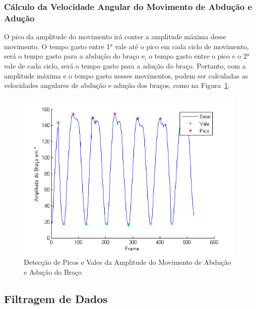 \subsubsection{Cálculo da Velocidade Angular do Movimento de Abdução e Adução}
O pico da amplitude do movimento irá conter a amplitude máxima desse movimento. O tempo gasto entre 1° vale até o pico em cada ciclo de movimento, será o tempo gasto para a abdução do braço e, o tempo gasto entre o pico e o 2° vale de cada ciclo, será o tempo gasto para a adução do braço. Portanto, com a amplitude máxima e o tempo gasto nesses movimentos, podem ser calculadas as velocidades angulares de abdução e adução dos braços, como na Figura~\ref{img:amplitude_braco_picos_vales}.
\begin{figure}[!htb]
     \centering
     \includegraphics[width=1\textwidth]{./img/amplitude-braco-picos.png}
     \caption{Detecção de Picos e Vales da Amplitude do Movimento de Abdução e Adução do Braço}
     \label{img:amplitude_braco_picos_vales}
\end{figure}

\subsection{Filtragem de Dados}\label{section:filtro_dados}

